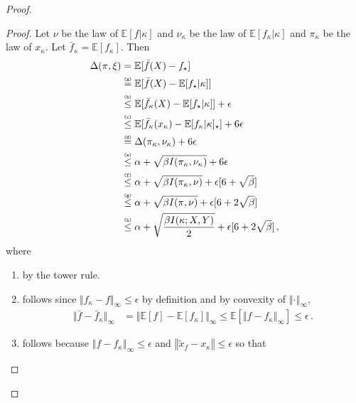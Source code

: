 \documentclass[letter, 12pt]{report}
\newcommand{\explan}[1]{\stackrel{\text{\tiny \texttt{#1}}}}
\newcommand{\norm}[1]{\left \Vert  #1 \right \Vert}
\newcommand{\snorm}[1]{ \Vert  #1 \Vert}
\newcommand{\E}{\mathbb E}
\newcommand{\1}{\mathbf{1}}
\theoremstyle{plain}
\theoremstyle{definition}
\theoremstyle{remark}
\begin{document}
\begin{proof}
    \begin{proof}
        Let $\nu$ be the law of $\E[f|\kappa]$ and $\nu_\kappa$ be the law of $\E[f_\kappa|\kappa]$ and
        $\pi_\kappa$ be the law of $x_\kappa$.
        Let $\bar f_\kappa = \E[f_\kappa]$.
        Then
        \begin{align*}
            \Delta(\pi, \xi)
             & = \E[\bar f(X) - f_\star]                                                                            \\
             & \explan{(a)}= \E[\bar f(X) - \E[f_\star|\kappa]]                                                     \\
             & \explan{(b)}\leq \E[\bar f_\kappa(X) - \E[f_\star|\kappa]] + \epsilon                                \\
             & \explan{(c)}\leq \E[\bar f_\kappa(x_\kappa) - \E[f_\kappa|\kappa]_\star] + 6 \epsilon                \\
             & \explan{(d)}= \Delta(\pi_\kappa, \nu_\kappa) + 6 \epsilon                                            \\
             & \explan{(e)}\leq \alpha + \sqrt{\beta I(\pi_\kappa, \nu_\kappa)} + 6 \epsilon                        \\
             & \explan{(f)}\leq \alpha + \sqrt{\beta I(\pi_\kappa, \nu)} + \epsilon[6 + \sqrt{\beta}]               \\
             & \explan{(g)}\leq \alpha + \sqrt{\beta I(\pi, \nu)} + \epsilon [6 + 2 \sqrt{\beta}]                   \\
             & \explan{(h)}\leq \alpha + \sqrt{\frac{\beta I(\kappa ; X, Y)}{2}} + \epsilon[6 + 2 \sqrt{\beta}] \,,
        \end{align*}
        where
        \begin{enumerate}
            \item by the tower rule.
            \item follows since $\snorm{f_\kappa - f}_\infty \leq \epsilon$ by definition and by convexity of $\norm{\cdot}_\infty$,
                  \begin{align*}
                      \snorm{\bar f - \bar f_\kappa}_\infty
                       & = \snorm{\E[f] - \E[f_\kappa]}_\infty
                      \leq \E[\snorm{f - f_\kappa}_\infty]
                      \leq \epsilon \,.
                  \end{align*}
            \item
                  follows because $\norm{f - f_\kappa}_\infty \leq \epsilon$ and $\norm{\tilde x_f - x_\kappa} \leq \epsilon$ so that

\end{enumerate}
\end{proof}
\end{proof}
\end{document}
